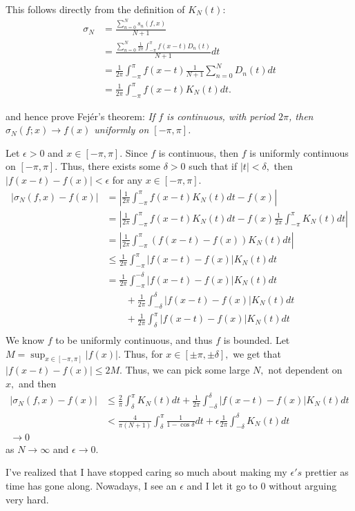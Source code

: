 \documentclass[11pt]{article}
\begin{document}
\begin{solution}
    This follows directly from the definition of $K_N(t):$
    \begin{align*}
    \sigma_N &= \frac{\sum_{n=0}^N s_n(f,x)}{N+1}\\ &= \frac{\sum_{n=0}^N \frac{1}{2\pi} \int_{-\pi}^\pi f(x-t) D_n(t)}{N+1}dt\\ &= \frac{1}{2\pi}\int_{-\pi}^\pi f(x-t)\frac{1}{N+1}\sum_{n=0}^N D_n(t)dt\\ &= \frac{1}{2\pi}\int_{-\pi}^\pi f(x-t)K_N(t)dt.    
    \end{align*}
    
\end{solution}

and hence prove Fejér's theorem:
\textit{If \( f \) is continuous, with period \( 2\pi \), then \( \sigma_N(f; x) \to f(x) \) uniformly on \([- \pi, \pi]\).}
\begin{solution}
    Let $\epsilon>0$ and $x\in [-\pi, \pi].$ Since $f$ is continuous, then $f$ is uniformly continuous on $[-\pi, \pi].$ Thus, there exists some $\delta>0$ such that if $|t|< \delta,$ then $|f(x-t) - f(x)|< \epsilon$ for any $x\in [-\pi, \pi].$
    \begin{align*}
        \left| \sigma_N(f,x) - f(x) \right| &= \left|\frac{1}{2\pi}\int_{-\pi}^\pi f(x-t)K_N(t)dt - f(x)\right|\\
        &= \left|\frac{1}{2\pi}\int_{-\pi}^\pi f(x-t)K_N(t)dt - f(x)\frac{1}{2\pi} \int_{-\pi}^\pi K_N(t)dt\right|\\
        &= \left|\frac{1}{2\pi} \int_{-\pi}^\pi \left(f(x-t) - f(x)\right) K_N(t)dt\right|\\
        &\leq \frac{1}{2\pi} \int_{-\pi}^\pi \left|f(x-t) - f(x)\right| K_N(t)dt\\
        &= \frac{1}{2\pi}\int_{-\pi}^{-\delta}|f(x-t)- f(x)|K_N(t)dt\\ &\qquad + \frac{1}{2\pi}\int_{-\delta}^\delta |f(x -t) - f(x)|K_N(t)dt\\ &\qquad + \frac{1}{2\pi}\int_{\delta}^\pi |f(x-t) - f(x)|K_N(t)dt\\
    \end{align*}
    We know $f$ to be uniformly continuous, and thus $f$ is bounded. Let $M = \sup_{x\in [-\pi, \pi]}|f(x)|.$ Thus, for $x\in [\pm\pi, \pm\delta],$ we get that $|f(x-t) - f(x)|\leq 2M.$ Thus, we can pick some large $N,$ not dependent on $x,$ and then
    \begin{align*}
        |\sigma_N(f,x) - f(x)|&\leq \frac{2}{\pi}\int_{\delta}^\pi K_N(t)dt + \frac{1}{2\pi}\int_{-\delta}^\delta |f(x -t) - f(x)|K_N(t)dt\\
        &< \frac{4}{\pi(N+1)}\int_\delta^\pi\frac{1}{1-\cos\delta}dt + \epsilon \frac{1}{2\pi}\int_{-\delta}^\delta K_N(t)dt\\
        \to 0
    \end{align*}
    as $N\to \infty$ and $\epsilon\to 0.$ 
\end{solution}
\begin{reflection}
    I've realized that I have stopped caring so much about making my $\epsilon's$ prettier as time has gone along. Nowadays, I see an $\epsilon$ and I let it go to $0$ without arguing very hard.
\end{reflection}
\newpage
\end{document}

